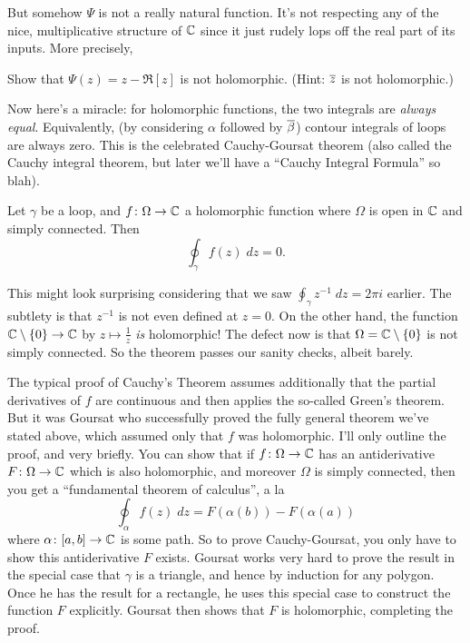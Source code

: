 But somehow $\Psi$ is not a really natural function.
It's not respecting any of the nice, multiplicative structure of $\mathbb C$ since
it just rudely lops off the real part of its inputs.
More precisely,
\begin{ques}
	Show that $\Psi(z) = z - \Re[z]$ is not holomorphic.
	(Hint: $\overline z$ is not holomorphic.)
\end{ques}

Now here's a miracle: for holomorphic functions, the two integrals are \emph{always equal}.
Equivalently, (by considering $\alpha$ followed by $\overline\beta$) contour integrals of loops are always zero.
This is the celebrated Cauchy-Goursat theorem
(also called the Cauchy integral theorem,
but later we'll have a ``Cauchy Integral Formula'' so blah).

\begin{theorem}
	Let $\gamma$ be a loop, and $f \colon \Omega \to \mathbb C$ a holomorphic function
	where $\Omega$ is open in $\mathbb C$ and simply connected.
	Then
	\[ \oint_\gamma f(z) \; dz = 0. \]
\end{theorem}
\begin{remark}
	This might look surprising considering that we saw $\oint_\gamma z^{-1} \; dz = 2 \pi i$ earlier.
	The subtlety is that $z^{-1}$ is not even defined at $z = 0$.
	On the other hand, the function $\mathbb C \setminus \{0\} \to \mathbb C$ by $z \mapsto \frac 1z$ \emph{is} holomorphic!
	The defect now is that $\Omega = \mathbb C \setminus \{0\}$ is not simply connected.
	So the theorem passes our sanity checks, albeit barely.
\end{remark}

The typical proof of Cauchy's Theorem assumes additionally
that the partial derivatives of $f$ are continuous
and then applies the so-called Green's theorem.
But it was Goursat who successfully proved the fully general theorem we've stated above,
which assumed only that $f$ was holomorphic.
I'll only outline the proof, and very briefly.
You can show that if $f \colon \Omega \to \mathbb C$ has an antiderivative $F \colon \Omega \to \mathbb C$ which is also holomorphic,
and moreover $\Omega$ is simply connected, then you get a ``fundamental theorem of calculus'', a la
\[ \oint_\alpha f(z) \; dz = F(\alpha(b)) - F(\alpha(a)) \]
where $\alpha \colon [a,b] \to \mathbb C$ is some path.
So to prove Cauchy-Goursat, you only have to show this antiderivative $F$ exists.
Goursat works very hard to prove the result in the special case that $\gamma$ is a triangle,
and hence by induction for any polygon.
Once he has the result for a rectangle, he uses this special case to construct the function $F$ explicitly.
Goursat then shows that $F$ is holomorphic, completing the proof.

